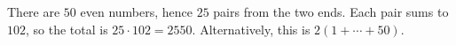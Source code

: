 There are $50$ even numbers, hence $25$ pairs from the two ends. Each pair sums to $102$, so the total is $25\cdot102=\boxed{2550}$. Alternatively, this is $2(1+\cdots+50)$.
